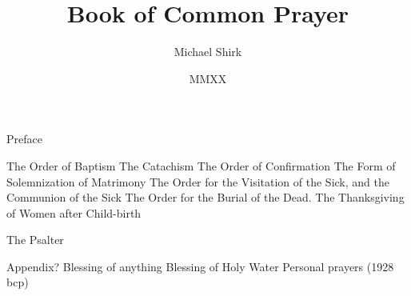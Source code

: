 \documentclass[foolscapvopaper,11pt,twoside,openany,extrafontsizes,final]{memoir}
\begin{document}
\frontmatter
\title{Book of Common Prayer}
\author{Michael Shirk}
\date{MMXX}

\tableofcontents*


Preface


\mainmatter


\mainmatter







% 

The Order of Baptism
The Catachism
The Order of Confirmation
The Form of Solemnization of Matrimony
The Order for the Visitation of the Sick, and the Communion of the Sick
The Order for the Burial of the Dead.
The Thanksgiving of Women after Child-birth

The Psalter

Appendix?
Blessing of anything
Blessing of Holy Water
Personal prayers (1928 bcp)
\end{document}
